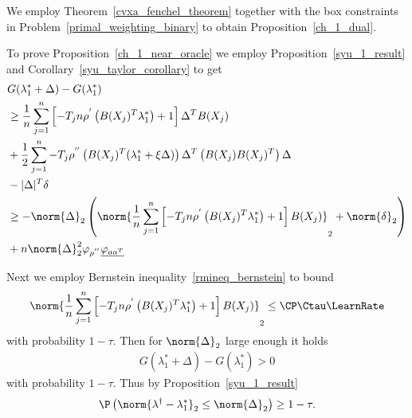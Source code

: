 
We employ 
Theorem~\ref{cvxa_fenchel_theorem}
together with the box constraints in 
Problem~\eqref{primal_weighting_binary}
to obtain Proposition~\ref{ch_1_dual}.

To prove Proposition~\ref{ch_1_near_oracle}
we employ
Proposition~\ref{syu_1_result}
and 
Corollary~\ref{syu_taylor_corollary}
to get
\begin{align}
  \begin{split}
    & 
    G(\lambda^*_1 + \Delta) 
    -
    G(\lambda^*_1)
\\
    &\ge
    \frac{1}{n}
    \sum_{j = 1}^{n} 
      \left[ 
        -T_j n 
        \rho^{'} 
        \left( 
          B(X_j)^T \lambda^*_1
        \right)
        +
        1
      \right]
      \Delta^T B(X_j)
\\
    & +
    \frac{1}{2}
    \sum_{j = 1}^{n} 
      -T_j  
      \rho^{''} 
      \left( 
        B(X_j)^T 
        (
          \lambda^*_1 + \xi \Delta
        )
      \right)
      \Delta^T
      \left( 
        B(X_j)
        B(X_j)^T
      \right)
      \Delta
\\
    &-
    |\Delta|^T \delta
\\
    &\ge
    - \norm{\Delta}_2
    \left( 
      \norm{
        \frac{1}{n}
        \sum_{j = 1}^{n} 
          \left[ 
            -T_j n 
            \rho^{'} 
            \left( 
              B(X_j)^T \lambda^*_1
            \right)
            +
            1
          \right]
        B(X_j)
      }_2
      +
      \norm{\delta}_2
    \right)
\\
    &+
    n
    \norm{\Delta}^2_2
    \varphi_{\rho^{''}}
    \underline{\varphi_{aa^T}}
  \end{split}
\end{align}

Next we employ Bernstein inequality~\ref{rmineq_bernstein} to bound
\begin{align}
    \norm{
      \frac{1}{n}
      \sum_{j = 1}^{n} 
      \left[ 
        -T_j n 
        \rho^{'} 
        \left( 
          B(X_j)^T \lambda^*_1
        \right)
      +
      1
      \right]
      B(X_j)
    }_2
    \le
    \CP \Ctau \LearnRate
\end{align}
with probability $1 - \tau$.
Then for 
$\norm{\Delta}_2$ large enough it holds
\begin{gather}
  G(\lambda^*_1 + \Delta) 
  -
  G(\lambda^*_1)
  >
  0
\end{gather}
with probability $1 - \tau$.
Thus by Proposition~\ref{syu_1_result}
  \begin{gather}
    \P
    \left( 
      \norm{
        \lambda^\dagger
        -
        \lambda^*_1
      }_2
      \le
      \norm{\Delta}_2
    \right)
    \ge 
    1 - \tau
    .
  \end{gather}


